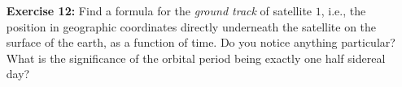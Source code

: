 \documentclass[11pt]{article}
\theoremstyle{definition}
\newcommand{\1}[1]{\mathbf{1} \left \{ #1 \right \}}
\begin{document}
\begin{itemize}
\item[{\textbf{Exercise 12:}}] Find a formula for the \textit{ground track} of satellite $1$, i.e., the position in geographic coordinates directly underneath the satellite on the surface of the earth, as a function of time.  Do you notice anything particular?  What is the significance of the orbital period being exactly one half sidereal day?
\end{itemize}
\end{document}
